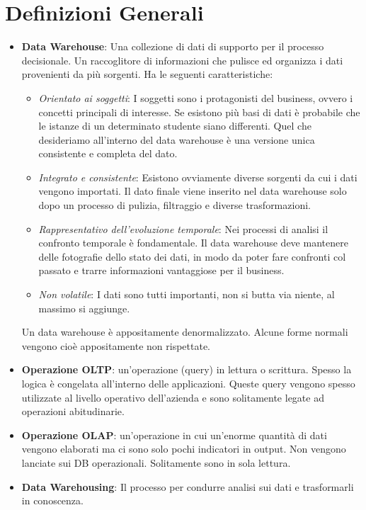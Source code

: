\section{Definizioni Generali}

\begin{itemize}
	\item \textbf{Data Warehouse}: Una collezione di dati di supporto per il processo decisionale. Un raccoglitore di informazioni che pulisce ed organizza i dati provenienti da più sorgenti. Ha le seguenti caratteristiche:
	\begin{itemize}
		\item \textit{Orientato ai soggetti}: I soggetti sono i protagonisti del business, ovvero i concetti principali di interesse. Se esistono più basi di dati è probabile che le istanze di un determinato studente siano differenti. Quel che desideriamo all'interno del data warehouse è una versione unica consistente e completa del dato. 
		\item \textit{Integrato e consistente}: Esistono ovviamente diverse sorgenti da cui i dati vengono importati. Il dato finale viene inserito nel data warehouse solo dopo un processo di pulizia, filtraggio e diverse trasformazioni.
		\item \textit{Rappresentativo dell'evoluzione temporale}: Nei processi di analisi il confronto temporale è fondamentale. Il data warehouse deve mantenere delle fotografie dello stato dei dati, in modo da poter fare confronti col passato e trarre informazioni vantaggiose per il business.
		\item \textit{Non volatile}: I dati sono tutti importanti, non si butta via niente, al massimo si aggiunge.
	\end{itemize}
	Un data warehouse è appositamente denormalizzato. Alcune forme normali vengono cioè appositamente non rispettate.
	\item \textbf{Operazione OLTP}: un'operazione (query) in lettura o scrittura. Spesso la logica è congelata all'interno delle applicazioni. Queste query vengono spesso utilizzate al livello operativo dell'azienda e sono solitamente legate ad operazioni abitudinarie.
	\item \textbf{Operazione OLAP}: un'operazione in cui un'enorme quantità di dati vengono elaborati ma ci sono solo pochi indicatori in output. Non vengono lanciate sui DB operazionali. Solitamente sono in sola lettura.
	\item \textbf{Data Warehousing}: Il processo per condurre analisi sui dati e trasformarli in conoscenza.

\end{itemize}

